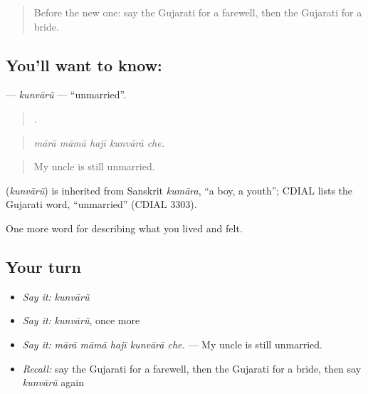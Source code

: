 \label{lesson:GU-C498-kunvaru}



\begin{quote}
Before the new one: say the Gujarati for a farewell, then the Gujarati for a bride.
\end{quote}

\subsection*{You'll want to know: }
\textbf{} — \emph{kunvārũ} — \textquotedblleft{}unmarried\textquotedblright{}.

\begin{quote}
    .
\end{quote}

\begin{quote}
\emph{mārā māmā hajī kunvārā che.}
\end{quote}

\begin{quote}
My uncle is still unmarried.
\end{quote}

\begin{cousinweb}
\textbf{} (\emph{kunvārũ}) is inherited from Sanskrit \emph{kumāra}, \textquotedblleft{}a boy, a youth\textquotedblright{}; CDIAL lists the Gujarati word, \textquotedblleft{}unmarried\textquotedblright{} (CDIAL 3303).
\end{cousinweb}

\begin{grammarlens}[title={What you've built}]
One more word for describing what you lived and felt.
\end{grammarlens}

\subsection*{Your turn}
\begin{itemize}
\raggedright
  \item \emph{Say it:} \emph{kunvārũ}
  \item \emph{Say it:} \emph{kunvārũ}, once more
  \item \emph{Say it:} \emph{mārā māmā hajī kunvārā che.} — My uncle is still unmarried.
  \item \emph{Recall:} say the Gujarati for a farewell, then the Gujarati for a bride, then say \emph{kunvārũ} again
\end{itemize}

